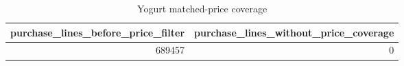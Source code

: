 \begin{table}
\caption{Yogurt matched-price coverage}
\begin{tabular}{rr}
\toprule
purchase\_lines\_before\_price\_filter & purchase\_lines\_without\_price\_coverage \\
\midrule
689457 & 0 \\
\bottomrule
\end{tabular}
\end{table}
